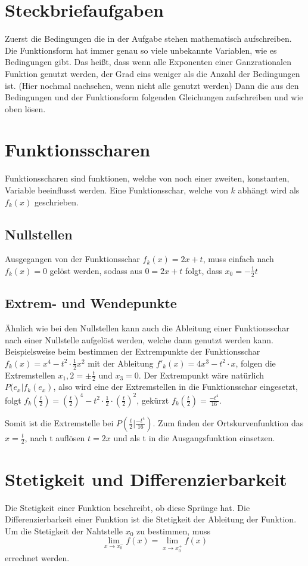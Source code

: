 \documentclass{article}
\begin{document}
\section{Steckbriefaufgaben}
Zuerst die Bedingungen die in der Aufgabe stehen mathematisch aufschreiben. Die Funktionsform hat immer genau so viele unbekannte Variablen, wie es Bedingungen gibt. Das heißt, dass wenn alle Exponenten einer Ganzrationalen Funktion genutzt werden, der Grad eins weniger als die Anzahl der Bedingungen ist. (Hier nochmal nachsehen, wenn nicht alle genutzt werden) Dann die aus den Bedingungen und der Funktionsform folgenden Gleichungen aufschreiben und wie oben lösen.
 
\section{Funktionsscharen}
Funktionsscharen sind funktionen, welche von noch einer zweiten, konstanten, Variable beeinflusst werden. Eine Funktionsschar, welche von $k$ abhängt wird als $f_k(x)$ geschrieben.
 
\subsection{Nullstellen}
Ausgegangen von der Funktionsschar $f_k(x)=2x+t$, muss einfach nach $f_k(x)=0$ gelöst werden, sodass aus $0=2x+t$ folgt, dass $x_0=-\frac{1}{2}t$
 
\subsection{Extrem- und Wendepunkte} 
Ähnlich wie bei den Nullstellen kann auch die Ableitung einer Funktionsschar nach einer Nullstelle aufgelöst werden, welche dann genutzt werden kann. Beispielsweise beim bestimmen der Extrempunkte der Funktionsschar $f_k(x)=x^4-t^2 \cdot \frac{1}{2}x^2$ mit der Ableitung $f'_k(x)=4x^3-t^2 \cdot x$, folgen die Extremstellen $x_1,2=\pm \frac{t}{2}$ und $x_3=0$. Der Extrempunkt wäre natürlich $P(e_x|f_k(e_x)$, also wird eine der Extremstellen in die Funktionsschar eingesetzt, folgt $f_k(\frac{t}{2})=(\frac{t}{2})^4-t^2 \cdot \frac{1}{2} \cdot (\frac{t}{2})^2$, gekürzt $f_k(\frac{t}{2})=\frac{-t^4}{16}$.
 
Somit ist die Extremstelle bei $P(\frac{t}{2}|\frac{-t^4}{16})$. Zum finden der Ortskurvenfunktion das $x=\frac{t}{2}$, nach t auflösen $t=2x$ und als t in die Ausgangsfunktion einsetzen.
 
\section{Stetigkeit und Differenzierbarkeit}
Die Stetigkeit einer Funktion beschreibt, ob diese Sprünge hat. Die Differenzierbarkeit einer Funktion ist die Stetigkeit der Ableitung der Funktion.
Um die Stetigkeit der Nahtstelle $x_0$ zu bestimmen, muss 
\[
\lim_{x \to x_0^-} f(x) = \lim_{x \to x_0^+} f(x) 
\]
errechnet werden.
 
\end{document}

